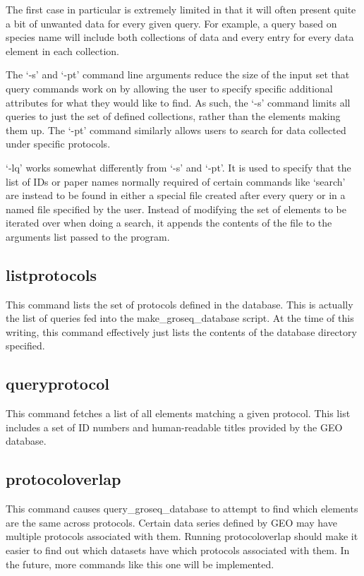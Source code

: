 \documentclass[12pt,letterpaper]{article}
\begin{document}
The first case in particular is extremely limited in that it will often present quite a bit of unwanted data for every given query. For example,
a query based on species name will include both collections of data and every entry for every data element in each collection.

The `-s' and `-pt' command line arguments reduce the size of the input set that query commands work on by allowing the user to specify specific
additional attributes for what they would like to find. As such, the `-s' command limits all queries to just the set of defined collections, rather than 
the elements making them up. The `-pt' command similarly allows users to search for data collected under specific protocols.

`-lq' works somewhat differently from `-s' and `-pt'. It is used to specify that the list of IDs or paper names normally required of certain commands like `search'
are instead to be found in either a special file created after every query or in a named file specified by the user. Instead of modifying the set of elements
to be iterated over when doing a search, it appends the contents of the file to the arguments list passed to the program.

\subsection{listprotocols}
This command lists the set of protocols defined in the database. This is actually the list of queries fed into the make\_groseq\_database script. 
At the time of this writing, this command effectively just lists the contents of the database directory specified.

\subsection{queryprotocol}
This command fetches a list of all elements matching a given protocol. This list includes a set of ID numbers and human-readable titles provided by the GEO database.

\subsection{protocoloverlap}
This command causes query\_groseq\_database to attempt to find which elements are the same across protocols. Certain data series defined by GEO may have multiple protocols
associated with them. Running protocoloverlap should make it easier to find out which datasets have which protocols associated with them. In the future, more commands
like this one will be implemented.
\end{document}
